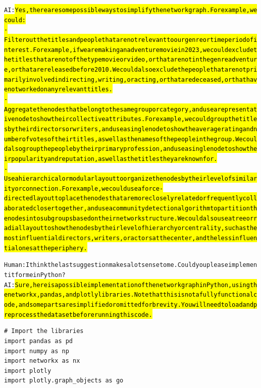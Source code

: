 \begin{tcolorbox}
\parbox[t]{\linewidth}{\tiny\begin{alltt}
AI:\hl{ Yes, there are some possible ways to simplify the network graph. For example, we could:\\
- Filter out the titles and people that are not relevant to our genre or time period of interest. For example, if we are making an adventure movie in 2023, we could exclude the titles that are not of the type movie or video, or that are not in the genre adventure, or that are released before 2010. We could also exclude the people that are not primarily involved in directing, writing, or acting, or that are deceased, or that have not worked on any relevant titles.\\
- Aggregate the nodes that belong to the same group or category, and use a representative node to show their collective attributes. For example, we could group the titles by their directors or writers, and use a single node to show the average rating and number of votes of their titles, as well as the names of the people in the group. We could also group the people by their primary profession, and use a single node to show their popularity and reputation, as well as the titles they are known for.\\
- Use a hierarchical or modular layout to organize the nodes by their level of similarity or connection. For example, we could use a force-directed layout to place the nodes that are more closely related or frequently collaborated closer together, and use a community detection algorithm to partition the nodes into subgroups based on their network structure. We could also use a tree or radial layout to show the nodes by their level of hierarchy or centrality, such as the most influential directors, writers, or actors at the center, and the less influential ones at the periphery.}

Human: I think the last suggestion makes a lot sense to me. Could you please implement it for me in Python?\\

AI:\hl{ Sure, here is a possible implementation of the network graph in Python, using the networkx, pandas, and plotly libraries. Note that this is not a fully functional code, and some parts are simplified or omitted for brevity. You will need to load and preprocess the dataset before running this code.}
\end{alltt}}
\vspace{-0.5cm}
\begin{verbatim}
# Import the libraries
import pandas as pd
import numpy as np
import networkx as nx
import plotly
import plotly.graph_objects as go


\end{verbatim}
\end{tcolorbox}
